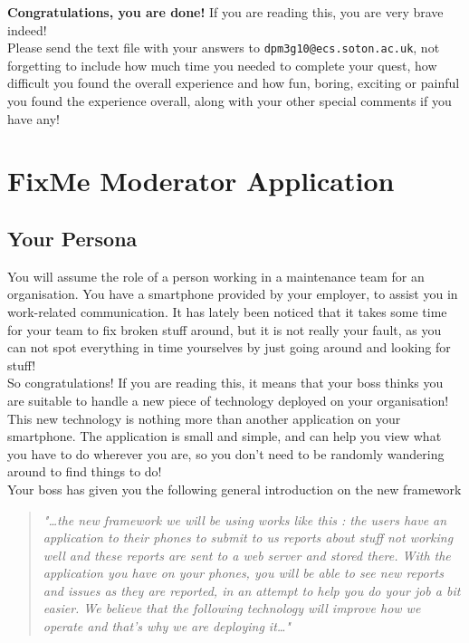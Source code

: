 \documentclass[12pt]{article}
\begin{document}
\vspace{5em}
\textbf{Congratulations, you are done!} If you are reading this, you are very brave indeed!\\

Please send the text file with your answers to \texttt{dpm3g10@ecs.soton.ac.uk}, not forgetting to include how much time you needed to complete your quest, how difficult you found the overall experience and how fun, boring, exciting or painful you found the experience overall, along with your other special comments if you have any!

\pagebreak
\section{FixMe Moderator Application}
\subsection{Your Persona}
You will assume the role of a person working in a maintenance team for an organisation. You have a smartphone provided by your employer, to assist you in work-related communication. It has lately been noticed that it takes some time for your team to fix broken stuff around, but it is not really your fault, as you can not spot everything in time yourselves by just going around and looking for stuff! \\

So congratulations! If you are reading this, it means that your boss thinks you are suitable to handle a new piece of technology deployed on your organisation!\\

This new technology is nothing more than another application on your smartphone. The application is small and simple, and can help you view what you have to do wherever you are, so you don't need to be randomly wandering around to find things to do!\\

Your boss has given you the following general introduction on the new framework \\
\begin{quotation}
\emph{"\dots the new framework we will be using works like this : the users have an application to their phones to submit to us reports about stuff not working well and these reports are sent to a web server and stored there. With the application you have on your phones, you will be able to see new reports and issues as they are reported, in an attempt to help you do your job a bit easier. We believe that the following technology will improve how we operate and that's why we are deploying it\dots "}
\end{quotation}
\end{document}

